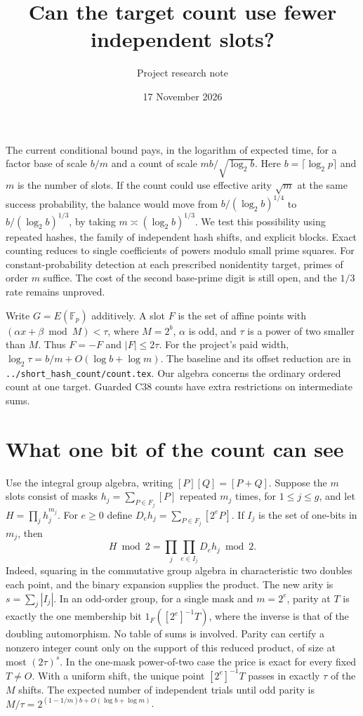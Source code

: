 \documentclass[11pt]{article}
\title{Can the target count use fewer independent slots?}
\author{Project research note}
\date{17 November 2026}
\begin{document}
\maketitle

The current conditional bound pays, in the logarithm of expected time,
for a factor base of scale $b/m$ and a count of scale
$mb/\sqrt{\log_2 b}$. Here $b=\lceil\log_2p\rceil$ and $m$ is the
number of slots. If the count could use effective arity $\sqrt m$
at the same success probability, the balance would move from
$b/(\log_2 b)^{1/4}$ to $b/(\log_2 b)^{1/3}$, by taking
$m\asymp(\log_2 b)^{1/3}$. We test this possibility using repeated
hashes, the family of independent hash shifts, and explicit blocks.
Exact counting reduces to single coefficients of powers modulo small
prime squares. For constant-probability detection at each prescribed
nonidentity target, primes of order $m$ suffice. The cost of the
second base-prime digit is still open, and the $1/3$ rate remains unproved.

Write $G=E(\mathbb F_p)$ additively. A slot $F$ is the set of
affine points with $(\alpha x+\beta\bmod M)<\tau$, where $M=2^b$,
$\alpha$ is odd, and $\tau$ is a power of two smaller than $M$.
Thus $F=-F$ and $|F|\le 2\tau$. For the project's paid width,
$\log_2\tau=b/m+O(\log b+\log m)$. The baseline and its offset
reduction are in \texttt{../short\_hash\_count/count.tex}.
Our algebra concerns the ordinary ordered count at one target.
Guarded C38 counts have extra restrictions on intermediate sums.

\section{What one bit of the count can see}
Use the integral group algebra, writing $[P][Q]=[P+Q]$.
Suppose the $m$ slots consist of masks $h_j=\sum_{P\in F_j}[P]$
repeated $m_j$ times, for $1\le j\le g$, and let $H=\prod_j h_j^{m_j}$.
For $e\ge0$ define $D_e h_j=\sum_{P\in F_j}[2^eP]$.
If $I_j$ is the set of one-bits in $m_j$, then
\[
   H\bmod 2=\prod_j\prod_{e\in I_j} D_e h_j\bmod 2 .
\]
Indeed, squaring in the commutative group algebra in characteristic
two doubles each point, and the binary expansion supplies the product.
The new arity is $s=\sum_j |I_j|$. In an odd-order group, for a
single mask and $m=2^e$, parity at $T$ is exactly the one membership
bit $1_F([2^e]^{-1}T)$, where the inverse is that of the doubling
automorphism. No table of sums is involved. Parity can certify a
nonzero integer count only on the support of this reduced product,
of size at most $(2\tau)^s$. In the one-mask power-of-two case the
price is exact for every fixed $T\ne O$. With a uniform shift, the
unique point $[2^e]^{-1}T$ passes in exactly $\tau$ of the $M$
shifts. The expected number of independent trials until odd parity
is $M/\tau=2^{(1-1/m)b+O(\log b+\log m)}$.
\end{document}
